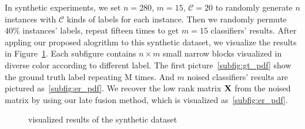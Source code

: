\documentclass[letterpaper]{article}
\def\calC{{\mathcal{C}}}
\def\bX{{\bf X}}
\def\bX{{\bf X}}
\begin{document}
In synthetic experiments, we set $n = 280$, $m = 15$, $\calC = 20$ to randomly generate $n$ instances with $\calC$ kinds of labels for each instance. 
Then we randomly permute $40\%$ instances' labels, repeat fifteen times to get $m = 15$ classifiers' results. 
After appling our proposed alogrithm to this synthetic dataset, we visualize the results in Figure~\ref{fig:ensemble_cluster}.
Each subfigure contains $n\times m$ small narrow blocks visualized in diverse color according to different label. 
The first picture~\ref{subfig:gt_pdf} show the ground truth label repeating M times. 
And $m$ noised classifiers' results are pictured as~\ref{subfig:er_pdf}. 
We recover the low rank matrix $\bX$ from the noised matrix by using our late fusion method, which is visualized as~\ref{subfig:er_pdf}.

\begin{figure}[htp]
\center
    \caption{visualized results of the synthetic dataset} \label{fig:ensemble_cluster}
\end{figure}
\end{document}
